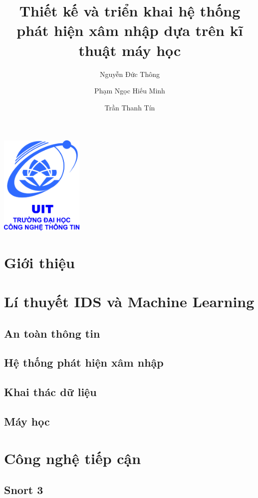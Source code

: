 \documentclass{article}
\title{Thiết kế và triển khai hệ thống phát hiện xâm nhập dựa trên kĩ thuật máy học}
\author{
    Nguyễn Đức Thông
    \and
    Phạm Ngọc Hiếu Minh
    \and
    Trần Thanh Tín
}
\begin{document}
    \maketitle
    \centering
    \includegraphics[width=4cm]{logo}
    \newpage
    \tableofcontents
    \newpage

    \begin{flushleft}
        \section{Giới thiệu}
        
        \newpage
        \section{Lí thuyết IDS và Machine Learning}
        \subsection{An toàn thông tin}
        
        \subsection{Hệ thống phát hiện xâm nhập}
        
        \subsection{Khai thác dữ liệu}
        
        \subsection{Máy học}
        
        \newpage
        \section{Công nghệ tiếp cận}
        \subsection{Snort 3}
        

\end{flushleft}
\end{document}

